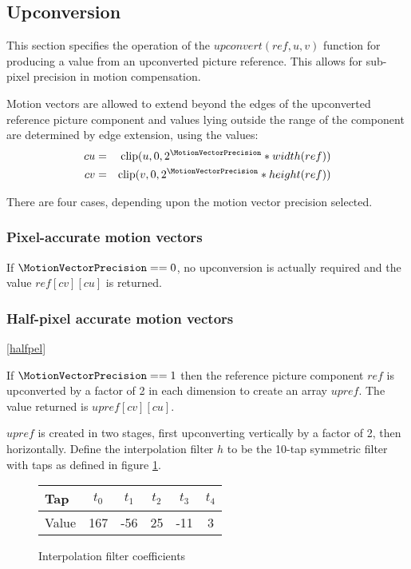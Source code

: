 \subsection{Upconversion}
\label{upconvert}

This section specifies the operation of the $upconvert(ref, u, v)$ function
for producing a value from an upconverted picture reference. This
allows for sub-pixel precision in motion compensation.

Motion vectors are allowed to extend beyond the edges of the 
upconverted reference picture component and values lying outside the range
of the component are determined by edge extension, using the values:
\begin{eqnarray*}
cu & = &\clip(u, 0, 2^\MotionVectorPrecision*width(ref)) \\
cv & = &\clip(v, 0, 2^\MotionVectorPrecision*height(ref))
\end{eqnarray*}

There are four cases, depending upon the motion vector precision selected.

\subsubsection{Pixel-accurate motion vectors}

If $\MotionVectorPrecision==0$, no upconversion is actually required and the value
$ref[cv][cu]$ is returned.

\subsubsection{Half-pixel accurate motion vectors}
\ref{halfpel}

If $\MotionVectorPrecision==1$ then the reference picture component $ref$ is
upconverted by a factor of 2 in each dimension to create an
array $upref$. The value returned is $upref[cv][cu]$.

$upref$ is created in two stages, first upconverting vertically by
a factor of 2, then horizontally. Define the interpolation filter $h$
to be the 10-tap symmetric filter with taps as defined in figure \ref{upfilter}.

\begin{figure}[h!]
\begin{centering}
\begin{tabular}{l|ccccc}
Tap & $t_0$ & $t_1$ & $t_2$ & $t_3$ & $t_4$\\
\hline
Value & 167 & -56 & 25 & -11 & 3
\end{tabular}
\caption{Interpolation filter coefficients \label{upfilter}}
\end{centering}
\end{figure}

